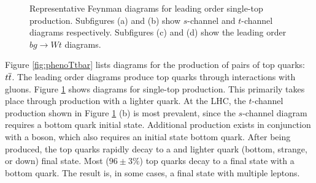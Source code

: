 \begin{figure}[h!]
\captionsetup[subfigure]{position=b}
\centering
{}
\hspace{2em}
\hspace{2em}
\hspace{2em}
\caption{Representative Feynman diagrams for leading order single-top production. Subfigures (a) and (b) show $s$-channel and $t$-channel diagrams respectively. Subfigures (c) and (d) show the leading order $bg\to Wt$ diagrams.}
\label{fig:phenoSingleTop}
\end{figure}

Figure \ref{fig:phenoTtbar} lists diagrams for the production of pairs of top quarks: $t\overline{t}$.
The leading order diagrams produce top quarks through interactions with gluons.
Figure \ref{fig:phenoSingleTop} shows diagrams for single-top production.
This primarily takes place through production with a lighter quark.
At the LHC, the $t$-channel production shown in Figure \ref{fig:phenoSingleTop} (b) is most prevalent, since the $s$-channel diagram requires a bottom quark initial state. \cite{Kidonakis:2011wy}
Additional production exists in conjunction with a \W boson, which also requires an initial state bottom quark. \cite{Kidonakis:2010ux}
After being produced, the top quarks rapidly decay to a \W and lighter quark (bottom, strange, or down) final state.
Most ($96\pm3\%$) top quarks decay to a final state with a bottom quark. \cite{pdg2018}
The result is, in some cases, a final state with multiple leptons.


